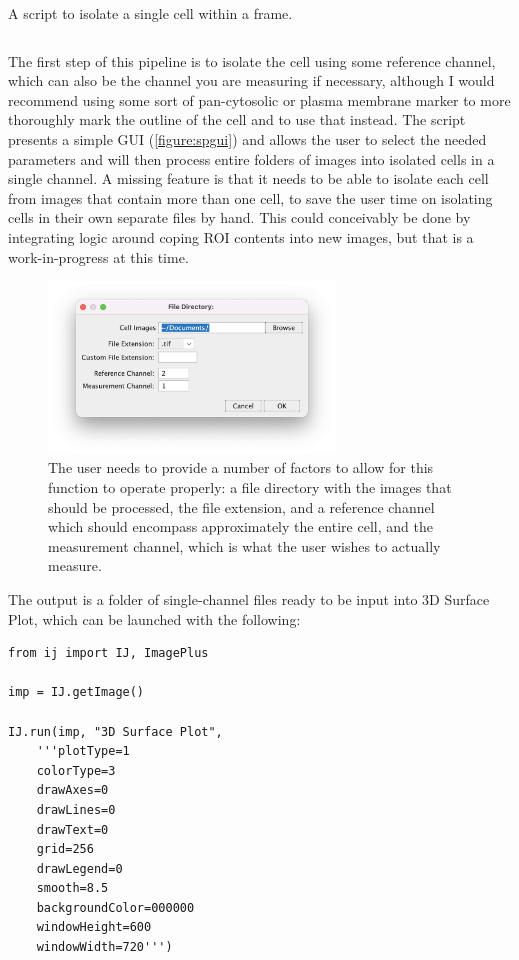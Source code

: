 \begin{code}
\caption{A script to isolate a single cell within a frame.}
\label{isolator}

\inputminted[breaklines,frame=single,fontsize=\small]{python}{source/autoIsolator.py}

\end{code}

The first step of this pipeline is to isolate the cell using some reference channel, which can also be the channel you are measuring if necessary, although I would recommend using some sort of pan\hyp{}cytosolic or plasma membrane marker to more thoroughly mark the outline of the cell and to use that instead. The script presents a simple GUI (\autoref{figure:spgui}) and allows the user to select the needed parameters and will then process entire folders of images into isolated cells in a single channel. A missing feature is that it needs to be able to isolate each cell from images that contain more than one cell, to save the user time on isolating cells in their own separate files by hand. This could conceivably be done by integrating logic around coping ROI contents into new images, but that is a work\hyp{}in\hyp{}progress at this time.

\begin{figure}
\centering
\includegraphics[width=3in]{images/spgui.png}
\caption{The user needs to provide a number of factors to allow for this function to operate properly: a file directory with the images that should be processed, the file extension, and a reference channel which should encompass approximately the entire cell, and the measurement channel, which is what the user wishes to actually measure.}
\label{figure:spgui}
\end{figure}

The output is a folder of single\hyp{}channel files ready to be input into 3D Surface Plot, which can be launched with the following:

\begin{code}
\begin{verbatim}
from ij import IJ, ImagePlus

imp = IJ.getImage()

IJ.run(imp, "3D Surface Plot", 
    '''plotType=1 
    colorType=3 
    drawAxes=0 
    drawLines=0 
    drawText=0 
    grid=256 
    drawLegend=0 
    smooth=8.5 
    backgroundColor=000000 
    windowHeight=600 
    windowWidth=720''')
\end{verbatim}
\end{code}

